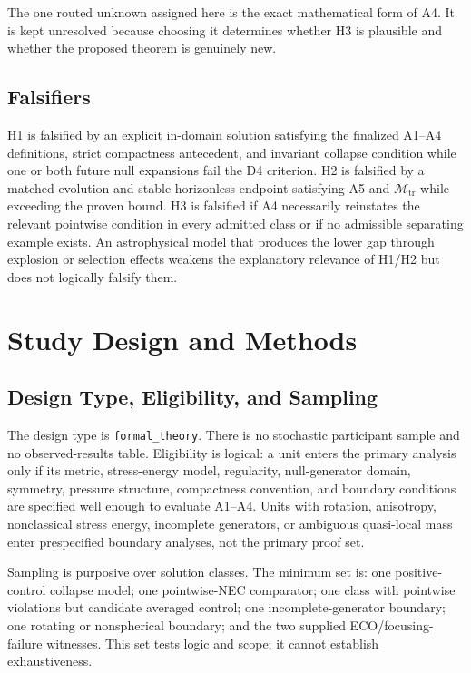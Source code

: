 \documentclass[conference]{IEEEtran}
\begin{document}
The one routed unknown assigned here is the exact mathematical form of A4. It is kept unresolved because choosing it determines whether H3 is plausible and whether the proposed theorem is genuinely new.

\subsection{Falsifiers}
H1 is falsified by an explicit in-domain solution satisfying the finalized A1--A4 definitions, strict compactness antecedent, and invariant collapse condition while one or both future null expansions fail the D4 criterion. H2 is falsified by a matched evolution and stable horizonless endpoint satisfying A5 and $\mathcal{M}_{\mathrm{tr}}$ while exceeding the proven bound. H3 is falsified if A4 necessarily reinstates the relevant pointwise condition in every admitted class or if no admissible separating example exists. An astrophysical model that produces the lower gap through explosion or selection effects weakens the explanatory relevance of H1/H2 but does not logically falsify them.

\section{Study Design and Methods}
\label{sec:methods}

\subsection{Design Type, Eligibility, and Sampling}
The design type is \texttt{formal\_theory}. There is no stochastic participant sample and no observed-results table. Eligibility is logical: a unit enters the primary analysis only if its metric, stress-energy model, regularity, null-generator domain, symmetry, pressure structure, compactness convention, and boundary conditions are specified well enough to evaluate A1--A4. Units with rotation, anisotropy, nonclassical stress energy, incomplete generators, or ambiguous quasi-local mass enter prespecified boundary analyses, not the primary proof set.

Sampling is purposive over solution classes. The minimum set is: one positive-control collapse model; one pointwise-NEC comparator; one class with pointwise violations but candidate averaged control; one incomplete-generator boundary; one rotating or nonspherical boundary; and the two supplied ECO/focusing-failure witnesses. This set tests logic and scope; it cannot establish exhaustiveness.
\end{document}
